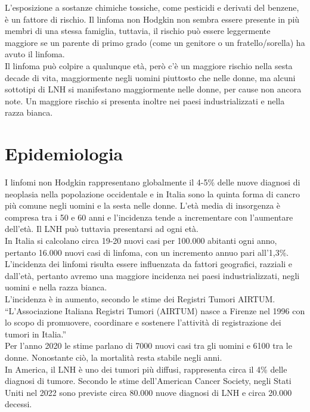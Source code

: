 L’esposizione a sostanze chimiche tossiche, come pesticidi e derivati del benzene, è un fattore di rischio. 
Il linfoma non Hodgkin non sembra essere presente in più membri di una stessa famiglia, tuttavia, 
il rischio può essere leggermente maggiore se un parente di primo grado (come un genitore o un fratello/sorella) 
ha avuto il linfoma\cite{AMERICANCS}.\\
Il linfoma può colpire a qualunque età, però c’è un maggiore rischio nella sesta decade di vita, 
maggiormente negli uomini piuttosto che nelle donne, ma alcuni sottotipi di LNH si manifestano 
maggiormente nelle donne, per cause non ancora note. 
Un maggiore rischio si presenta inoltre nei paesi industrializzati e nella razza bianca\cite{AMERICANCS}.\\ 

\section{Epidemiologia}
I linfomi non Hodgkin rappresentano globalmente il 4-5\% delle nuove diagnosi di neoplasia nella popolazione 
occidentale e in Italia 
sono la quinta forma di cancro più comune negli uomini e la sesta nelle donne\cite{AIOM}. 
L’età media di insorgenza è compresa tra i 50 e 60 anni e l’incidenza tende a incrementare con l’aumentare dell’età. 
Il LNH può tuttavia presentarsi ad ogni età.\\ 
In Italia si calcolano circa 19-20 nuovi casi per 100.000 abitanti ogni anno, pertanto 16.000 nuovi casi di linfoma, 
con un incremento annuo pari all’1,3\%\cite{AIOM}.\\
L’incidenza dei linfomi risulta essere influenzata da fattori geografici, razziali e dall'età, 
pertanto avremo una maggiore incidenza nei paesi industrializzati, negli uomini e nella razza bianca\cite{AIOM}.\\
L’incidenza è in aumento, secondo le stime dei Registri Tumori AIRTUM. “L’Associazione Italiana Registri Tumori 
(AIRTUM) nasce a Firenze nel 1996 con lo scopo di promuovere, coordinare e sostenere l’attività di registrazione 
dei tumori in Italia\cite{AIRTUM}.”\\
Per l’anno 2020 le stime parlano di 7000 nuovi casi tra gli uomini e 6100 tra le donne. 
Nonostante ciò, la mortalità resta stabile negli anni\cite{AIRC}.\\
In America, il LNH è uno dei tumori più diffusi, rappresenta circa il 4\% delle diagnosi di tumore. 
Secondo le stime dell’American Cancer Society, negli Stati Uniti nel 2022 sono previste circa 80.000 nuove 
diagnosi di LNH e circa 20.000 decessi\cite{Americanstatistic}.\\

